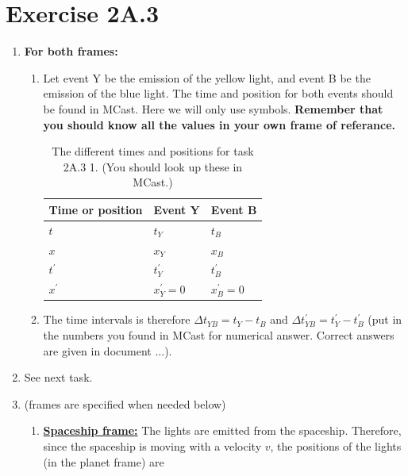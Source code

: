 \documentclass[a4paper,10pt,english]{article}
\begin{document}
\section*{Exercise 2A.3}

\begin{enumerate}

\item \textbf{For both frames:}

\begin{enumerate}

\item Let event Y be the emission of the yellow light, and event B be the emission of the blue light. The time and position for both events should be found in MCast. Here we will only use symbols. \textbf{Remember that you should know all the values in your own frame of referance.}

\begin{table}[H]
  \begin{center}
    \begin{tabular}{| l | l | l | }
   	\hline
	 Time or position & Event Y & Event B \\ \hline
	 $t$ & $t_Y$ & $t_B$ \\ \hline
	 $x$ & $x_Y$ & $x_B$ \\ \hline
	 $t^{\prime}$ & $t_Y^{\prime}$ & $t_B^{\prime}$ \\ \hline
	 $x^{\prime}$ & $x_Y^{\prime}=0$ & $x_B^{\prime}=0$ \\ \hline
	\end{tabular}
    \caption{The different times and positions for task 2A.3 1. (You should look up these in MCast.)}
    \label{tabel:1}
  \end{center}
\end{table}
\FloatBarrier

\item The time intervals is therefore $\Delta t_{YB}=t_{Y}-t_{B}$ and $\Delta t_{YB}^{\prime}=t_Y^{\prime}-t_B^{\prime}$ (put in the numbers you found in MCast for numerical answer. Correct answers are given in document $\ldots$).

\end{enumerate}

\item See next task.
\item (frames are specified when needed below)

\begin{enumerate}

\item
\underline{\bf{Spaceship frame:}} The lights are emitted from the spaceship. Therefore, since the spaceship is moving with a velocity $v$, the positions of the lights (in the planet frame) are


\end{enumerate}
\end{enumerate}
\end{document}
